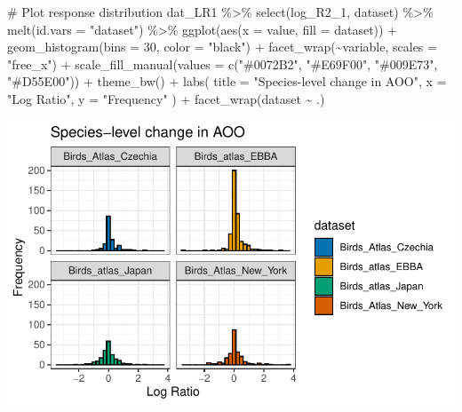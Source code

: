 \documentclass[
  letterpaper,
  DIV=11,
  numbers=noendperiod]{scrreprt}
\newenvironment{Shaded}{\begin{snugshade}}{\end{snugshade}}
\newcommand{\AttributeTok}[1]{\textcolor[rgb]{0.40,0.45,0.13}{#1}}
\newcommand{\CommentTok}[1]{\textcolor[rgb]{0.37,0.37,0.37}{#1}}
\newcommand{\DecValTok}[1]{\textcolor[rgb]{0.68,0.00,0.00}{#1}}
\newcommand{\FunctionTok}[1]{\textcolor[rgb]{0.28,0.35,0.67}{#1}}
\newcommand{\NormalTok}[1]{\textcolor[rgb]{0.00,0.23,0.31}{#1}}
\newcommand{\SpecialCharTok}[1]{\textcolor[rgb]{0.37,0.37,0.37}{#1}}
\newcommand{\StringTok}[1]{\textcolor[rgb]{0.13,0.47,0.30}{#1}}
\begin{document}
\begin{Shaded}
\begin{Highlighting}[]
\CommentTok{\# Plot response distribution}
\NormalTok{dat\_LR1 }\SpecialCharTok{\%\textgreater{}\%}
    \FunctionTok{select}\NormalTok{(log\_R2\_1, dataset) }\SpecialCharTok{\%\textgreater{}\%}
    \FunctionTok{melt}\NormalTok{(}\AttributeTok{id.vars =} \StringTok{"dataset"}\NormalTok{) }\SpecialCharTok{\%\textgreater{}\%}
    \FunctionTok{ggplot}\NormalTok{(}\FunctionTok{aes}\NormalTok{(}\AttributeTok{x =}\NormalTok{ value, }\AttributeTok{fill =}\NormalTok{ dataset)) }\SpecialCharTok{+}
    \FunctionTok{geom\_histogram}\NormalTok{(}\AttributeTok{bins =} \DecValTok{30}\NormalTok{, }\AttributeTok{color =} \StringTok{"black"}\NormalTok{) }\SpecialCharTok{+}
    \FunctionTok{facet\_wrap}\NormalTok{(}\SpecialCharTok{\textasciitilde{}}\NormalTok{variable, }\AttributeTok{scales =} \StringTok{"free\_x"}\NormalTok{) }\SpecialCharTok{+}
    \FunctionTok{scale\_fill\_manual}\NormalTok{(}\AttributeTok{values =} \FunctionTok{c}\NormalTok{(}\StringTok{"\#0072B2"}\NormalTok{, }\StringTok{"\#E69F00"}\NormalTok{, }\StringTok{"\#009E73"}\NormalTok{, }\StringTok{"\#D55E00"}\NormalTok{)) }\SpecialCharTok{+}
    \FunctionTok{theme\_bw}\NormalTok{() }\SpecialCharTok{+}
    \FunctionTok{labs}\NormalTok{(}
        \AttributeTok{title =} \StringTok{"Species{-}level change in AOO"}\NormalTok{,}
        \AttributeTok{x =} \StringTok{"Log Ratio"}\NormalTok{,}
        \AttributeTok{y =} \StringTok{"Frequency"}
\NormalTok{    ) }\SpecialCharTok{+}
    \FunctionTok{facet\_wrap}\NormalTok{(dataset }\SpecialCharTok{\textasciitilde{}}\NormalTok{ .)}
\end{Highlighting}
\end{Shaded}

\includegraphics{01_DataPrep_files/figure-pdf/unnamed-chunk-12-1.pdf}
\end{document}
